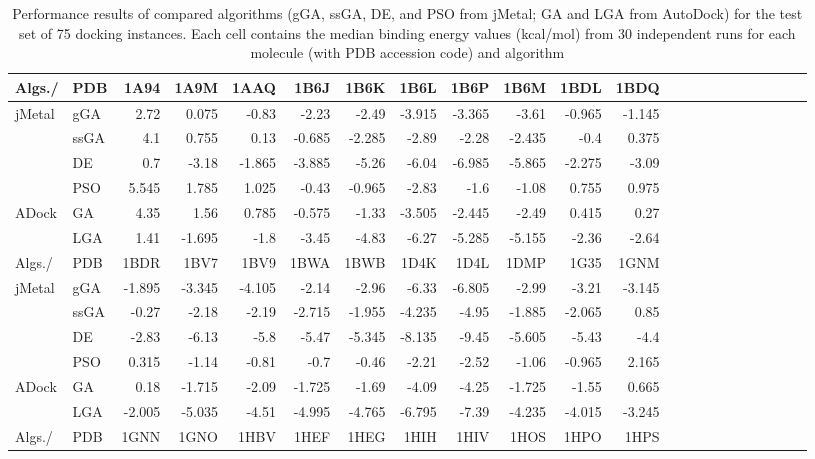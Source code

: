 \begin{table}
	\caption{\label{tab:asoc-medians-75}Performance results of compared algorithms (gGA, ssGA, DE, and PSO from jMetal; GA and LGA from AutoDock) for the test set of 75 docking instances. Each cell contains the median binding energy values (kcal/mol) from 30 independent runs for each molecule (with PDB accession code) and algorithm}
	\scriptsize
	\centering
	\begin{tabular}{ll|rrrrrrrrrrrrrrrrrrrr}
		\hline			
		Algs./ & PDB	 & 1A94 & 	1A9M	 & 1AAQ	 & 1B6J & 	1B6K & 	1B6L & 	1B6P & 	1B6M & 	1BDL & 	1BDQ\\
		\hline
		\multirow{4}{*}{jMetal} &   gGA	 & 2.72	 & 0.075 & 	-0.83 & -2.23 & -2.49 & -3.915 & 	-3.365 & 	-3.61 & 	-0.965 & 	-1.145 \\
		\multirow{4}{*}{} &        ssGA & 	4.1 & 	0.755 & 	0.13 & 	-0.685 & -2.285 & -2.89 & -2.28 & 	-2.435 & 	-0.4 & 	0.375\\
		\multirow{4}{*}{} &          DE	 &\cellcolor{gray25} 0.7 &\cellcolor{gray25} 	-3.18 &\cellcolor{gray25} 	-1.865 & \cellcolor{gray25}	-3.885 &\cellcolor{gray25} 	-5.26 & 	-6.04 &\cellcolor{gray25} 	-6.985	 &\cellcolor{gray25} -5.865 & 	-2.275 &\cellcolor{gray25} 	-3.09\\
		\multirow{4}{*}{} &          PSO	 & 5.545	 & 1.785	 & 1.025 & 	-0.43	 & -0.965 & 	-2.83	 & -1.6	 & -1.08	 & 0.755	 & 0.975\\
		\hline
		\multirow{2}{*}{ADock} &          GA	 & 4.35	 & 1.56 & 	0.785	 & -0.575	 & -1.33 & 	-3.505 & 	-2.445 & 	-2.49 & 	0.415 & 	0.27\\
		\multirow{2}{*}{} &         LGA & 	1.41	 & -1.695	 & -1.8	 & -3.45 & 	-4.83 & \cellcolor{gray25}	-6.27 & 	-5.285 & 	-5.155 & \cellcolor{gray25}	-2.36 & 	-2.64\\
		
		\hline
		\hline			
		Algs./ & PDB & 1BDR &	1BV7 &	1BV9 &	1BWA &	1BWB &	1D4K &	1D4L &	1DMP &	1G35 &	1GNM\\
		\hline
		\multirow{4}{*}{jMetal} &  gGA	 & -1.895&-3.345&-4.105&-2.14&-2.96&-6.33&-6.805&-2.99&-3.21&-3.145\\
		\multirow{4}{*}{} &           ssGA & 	-0.27&-2.18&-2.19&-2.715&-1.955&-4.235&-4.95&-1.885&-2.065&0.85\\
		\multirow{4}{*}{} &           DE	 &\cellcolor{gray25} -2.83&\cellcolor{gray25}-6.13&\cellcolor{gray25}-5.8&\cellcolor{gray25}-5.47&\cellcolor{gray25}-5.345&\cellcolor{gray25}-8.135&\cellcolor{gray25}-9.45&\cellcolor{gray25}-5.605&\cellcolor{gray25}-5.43&\cellcolor{gray25}-4.4\\
		\multirow{4}{*}{} &            PSO	 & 0.315&-1.14&-0.81&-0.7&-0.46&-2.21&-2.52&-1.06&-0.965&2.165\\
		\hline
		\multirow{2}{*}{ADock} &            GA	 & 0.18&-1.715&-2.09&-1.725&-1.69&-4.09&-4.25&-1.725&-1.55&0.665\\
		\multirow{2}{*}{} &            LGA  & -2.005&-5.035&-4.51&-4.995&-4.765&-6.795&-7.39&-4.235&-4.015&-3.245\\
		\hline	
		\hline			
		Algs./ & PDB &1GNN&1GNO&1HBV&1HEF&1HEG&1HIH&1HIV&1HOS&1HPO&1HPS\\
		\hline
		

\end{tabular}
\end{table}
